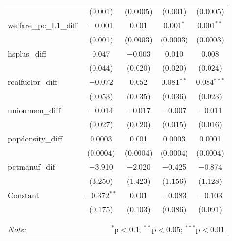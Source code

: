 \begin{table}[!htbp]
\begin{tabular}{@{\extracolsep{5pt}}lcccc}
  & (0.001) & (0.0005) & (0.001) & (0.0005) \\ 
  welfare\_pc\_L1\_diff & $-$0.001 & 0.001 & 0.001$^{*}$ & 0.001$^{**}$ \\ 
  & (0.001) & (0.0003) & (0.0003) & (0.0003) \\ 
  hsplus\_diff & 0.047 & $-$0.003 & 0.010 & 0.008 \\ 
  & (0.044) & (0.020) & (0.020) & (0.024) \\ 
  realfuelpr\_diff & $-$0.072 & 0.052 & 0.081$^{**}$ & 0.084$^{***}$ \\ 
  & (0.053) & (0.035) & (0.036) & (0.023) \\ 
  unionmem\_diff & $-$0.014 & $-$0.017 & $-$0.007 & $-$0.011 \\ 
  & (0.027) & (0.020) & (0.015) & (0.016) \\ 
  popdensity\_diff & 0.0003 & 0.001 & 0.0003 & 0.0001 \\ 
  & (0.0004) & (0.0004) & (0.0004) & (0.0004) \\ 
  pctmanuf\_dif & $-$3.910 & $-$2.020 & $-$0.425 & $-$0.874 \\ 
  & (3.250) & (1.423) & (1.156) & (1.128) \\ 
  Constant & $-$0.372$^{**}$ & 0.001 & $-$0.083 & $-$0.103 \\ 
  & (0.175) & (0.103) & (0.086) & (0.091) \\ 
 \hline \\[-1.8ex] 
\hline 
\hline \\[-1.8ex] 
\textit{Note:}  & \multicolumn{4}{r}{$^{*}$p$<$0.1; $^{**}$p$<$0.05; $^{***}$p$<$0.01} \\ 
\end{tabular} 
\end{table} 
